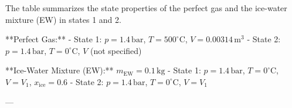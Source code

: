 The table summarizes the state properties of the perfect gas and the ice-water mixture (EW) in states 1 and 2.

**Perfect Gas:**
- State 1:  
  \( p = 1.4 \, \text{bar} \), \( T = 500^\circ\text{C} \), \( V = 0.00314 \, \text{m}^3 \)  
- State 2:  
  \( p = 1.4 \, \text{bar} \), \( T = 0^\circ\text{C} \), \( V \) (not specified)

**Ice-Water Mixture (EW):**  
\( m_{\text{EW}} = 0.1 \, \text{kg} \)  
- State 1:  
  \( p = 1.4 \, \text{bar} \), \( T = 0^\circ\text{C} \), \( V = V_1 \), \( x_{\text{ice}} = 0.6 \)  
- State 2:  
  \( p = 1.4 \, \text{bar} \), \( T = 0^\circ\text{C} \), \( V = V_1 \)

---
